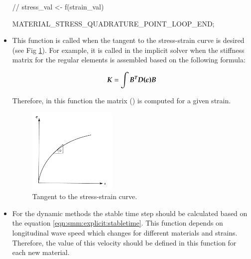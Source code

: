 \begin{itemize}
\begin{cpp}
// stress_val <- f(strain_val)

    MATERIAL_STRESS_QUADRATURE_POINT_LOOP_END;
  \end{cpp}




\item {}  This function is called when  the tangent to the stress-strain curve
  is desired (see Fig \ref {fig:smm:AL:K}).  For example, it is called in the implicit solver when
  the stiffness matrix for the regular elements is assembled based on the following formula:

  \begin{equation} \label{eqn:smm:constitutive_elasc}
    \boldsymbol{K } =\int{\ensuremath{\boldsymbol{B^T}}\ensuremath{\boldsymbol{D(\epsilon)}}\ensuremath{\boldsymbol{B}}}
  \end{equation}

Therefore, in this function the  matrix () is computed for a given strain.


  \begin{figure}[!htb]
    \begin{center}
      \includegraphics[width=0.4\textwidth,keepaspectratio=true]{figures/tangent.pdf}
      \caption{Tangent to the stress-strain curve.}
      \label{fig:smm:AL:K}
    \end{center}
  \end{figure}


\item {} For the dynamic methods the stable
  time     step    should     be    calculated     based     on    the
  equation \ref{eqn:smm:explicit:stabletime}.  This function depends
  on longitudinal wave speed which changes for different materials and strains. Therefore, the  value of
  this  velocity should  be  defined  in this  function  for each  new
  material.


\end{itemize}
